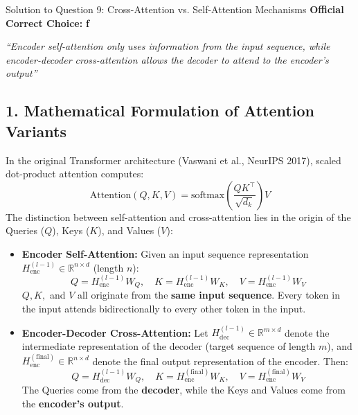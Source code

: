\documentclass[11pt,a4paper]{article}
\begin{document}
\vspace{0.4cm}

\begin{solutionbox}{Solution to Question 9: Cross-Attention vs. Self-Attention Mechanisms}
\textbf{Official Correct Choice:} \textbf{f}
\begin{center}
    \textit{``Encoder self-attention only uses information from the input sequence, while encoder-decoder cross-attention allows the decoder to attend to the encoder's output''}
\end{center}

\medskip
\subsection*{1. Mathematical Formulation of Attention Variants}
In the original Transformer architecture (Vaswani et al., NeurIPS 2017), scaled dot-product attention computes:
\begin{equation}
    \text{Attention}(Q, K, V) = \text{softmax}\left(\frac{Q K^\top}{\sqrt{d_k}}\right) V
\end{equation}
The distinction between self-attention and cross-attention lies in the origin of the Queries ($Q$), Keys ($K$), and Values ($V$):

\begin{tcolorbox}[colback=white,colframe=secondary,arc=2mm,title=\textbf{Structural Comparison of Attention Mechanisms}]
\small
\begin{itemize}[leftmargin=1.5em,itemsep=3pt]
    \item \textbf{Encoder Self-Attention:}
    Given an input sequence representation $H_{\text{enc}}^{(l-1)} \in \mathbb{R}^{n \times d}$ (length $n$):
    \begin{equation}
        Q = H_{\text{enc}}^{(l-1)} W_Q, \quad K = H_{\text{enc}}^{(l-1)} W_K, \quad V = H_{\text{enc}}^{(l-1)} W_V
    \end{equation}
    $Q, K,$ and $V$ all originate from the \textbf{same input sequence}. Every token in the input attends bidirectionally to every other token in the input.

    \item \textbf{Encoder-Decoder Cross-Attention:}
    Let $H_{\text{dec}}^{(l-1)} \in \mathbb{R}^{m \times d}$ denote the intermediate representation of the decoder (target sequence of length $m$), and $H_{\text{enc}}^{(\text{final})} \in \mathbb{R}^{n \times d}$ denote the final output representation of the encoder. Then:
    \begin{equation}
        Q = H_{\text{dec}}^{(l-1)} W_Q, \quad K = H_{\text{enc}}^{(\text{final})} W_K, \quad V = H_{\text{enc}}^{(\text{final})} W_V
    \end{equation}
    The Queries come from the \textbf{decoder}, while the Keys and Values come from the \textbf{encoder's output}.
\end{itemize}
\end{tcolorbox}


\end{solutionbox}
\end{document}
